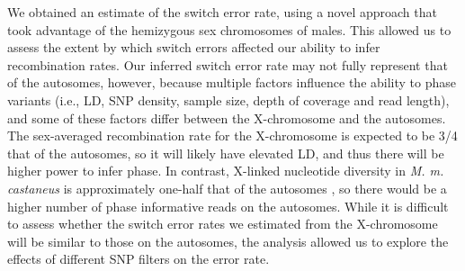        	We obtained an estimate of the switch error rate, using a novel approach that took advantage of the hemizygous sex chromosomes of males. This allowed us to assess the extent by which switch errors affected our ability to infer recombination rates. Our inferred switch error rate may not fully represent that of the autosomes, however, because multiple factors influence the ability to phase variants (i.e., LD, SNP density, sample size, depth of coverage and read length), and some of these factors differ between the X-chromosome and the autosomes. The sex-averaged recombination rate for the X-chromosome is expected to be 3/4 that of the autosomes, so it will likely have elevated LD, and thus there will be higher power to infer phase. In contrast, X-linked nucleotide diversity in \textit{M. m. castaneus} is approximately one-half that of the autosomes \citep{RN238}, so there would be a higher number of phase informative reads on the autosomes. While it is difficult to assess whether the switch error rates we estimated from the X-chromosome will be similar to those on the autosomes, the analysis allowed us to explore the effects of different SNP filters on the error rate.
 
